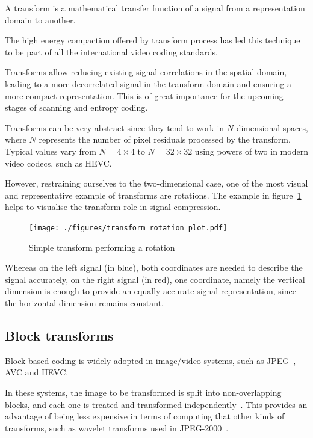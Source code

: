 \documentclass[11pt,a4paper,openright,twoside]{book}
\def\usepdfs{1} %
\numberwithin{equation}{section} %
\numberwithin{figure}{section} %
\numberwithin{table}{section} %
\begin{document}
A transform is a mathematical transfer function of a signal from a
representation domain to another.

The high energy compaction offered by transform process has led this technique
to be part of all the international video coding standards.

Transforms allow reducing existing signal correlations in the spatial domain,
leading to a more decorrelated signal in the transform domain and ensuring a
more compact representation.
This is of great importance for the upcoming stages of scanning and entropy
coding.

Transforms can be very abstract since they tend to work in $N$-dimensional
spaces, where $N$ represents the number of pixel residuals processed by the
transform.
Typical values vary from $N=4\times4$ to $N=32\times32$ using powers of two in
modern video codecs, such as \ac{HEVC}.

However, restraining ourselves to the two-dimensional case, one of the most
visual and representative example of transforms are rotations.
The example in figure~\ref{fig:transform_rotation} helps to visualise the
transform role in signal compression.

\begin{figure}[tb]
	\centering
	\ifthenelse{\usepdfs = 0}
	{}
	{\texttt{[image: ./figures/transform\_rotation\_plot.pdf]}}
	\caption{Simple transform performing a rotation}
	\label{fig:transform_rotation}
\end{figure}

Whereas on the left signal (in blue), both coordinates are needed to describe
the signal accurately, on the right signal (in red), one coordinate, namely
the vertical dimension is enough to provide an equally accurate signal
representation, since the horizontal dimension remains constant.

\subsection{Block transforms}
\label{sub:block_transforms}

Block-based coding is widely adopted in image/video systems, such as
\acs{JPEG}~\cite{jpeg}, \ac{AVC} and \ac{HEVC}.

In these systems, the image to be transformed is split into non-overlapping
blocks, and each one is treated and transformed
independently~\cite{xu-09-intra-predictive-transforms}.
This provides an advantage of being less expensive in terms of computing that
other kinds of transforms, such as wavelet transforms used in
\acs{JPEG}-2000~\cite{jpeg2000}.
\end{document}
